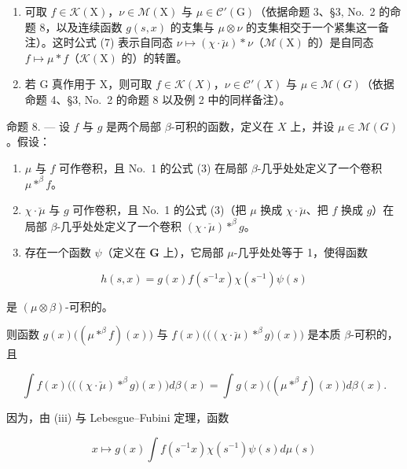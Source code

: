 \begin{enumerate}
\def\labelenumi{\arabic{enumi})}
\setcounter{enumi}{1}
\item
  可取 \(f \in \mathcal{K}(\mathrm{X})\)，\(\nu \in \mathcal{M}(\mathrm{X})\) 与 \(\mu \in \mathcal{C}'(\mathrm{G})\)（依据命题 3、§3, No.~2 的命题 8，以及连续函数 \(g(s,x)\) 的支集与 \(\mu \otimes \nu\) 的支集相交于一个紧集这一备注）。这时公式 (7) 表示自同态 \(\nu \mapsto (\chi \cdot \breve{\mu}) * \nu\)（\(\mathcal{M}(\mathrm{X})\) 的）是自同态 \(f \mapsto \mu * f\)（\(\mathcal{K}(\mathrm{X})\) 的）的转置。
\item
  若 G 真作用于 X，则可取 \(f \in \mathcal{K}(X)\)，\(\nu \in \mathcal{C}'(X)\) 与 \(\mu \in \mathcal{M}(G)\)（依据命题 4、§3, No.~2 的命题 8 以及例 2 中的同样备注）。
\end{enumerate}

命题 8. --- 设 \(f\) 与 \(g\) 是两个局部 \(\beta\)-可积的函数，定义在 \(X\) 上，并设 \(\mu \in \mathcal{M}(G)\)。假设：

\begin{enumerate}
\def\labelenumi{(\roman{enumi})}
\item
  \(\mu\) 与 \(f\) 可作卷积，且 No.~1 的公式 (3) 在局部 \(\beta\)-几乎处处定义了一个卷积 \(\mu *^{\beta} f\)。
\item
  \(\chi \cdot \breve{\mu}\) 与 \(g\) 可作卷积，且 No.~1 的公式 (3)（把 \(\mu\) 换成 \(\chi \cdot \breve{\mu}\)、把 \(f\) 换成 \(g\)）在局部 \(\beta\)-几乎处处定义了一个卷积 \((\chi \cdot \breve{\mu}) *^{\beta} g\)。
\item
  存在一个函数 \(\psi\)（定义在 \(\mathbf{G}\) 上），它局部 \(\mu\)-几乎处处等于 1，使得函数
\end{enumerate}

\[
h (s, x) = g (x) f \left(s ^ {- 1} x\right) \chi \left(s ^ {- 1}\right) \psi (s)
\]

是 \((\mu \otimes \beta)\)-可积的。

则函数 \(g(x)\big((\mu * ^ {\beta} f)(x)\big)\) 与 \(f(x)\big(\big((\chi \cdot \breve{\mu}) * ^ {\beta} g\big)(x)\big)\) 是本质 \(\beta\)-可积的，且

\[
\int f (x) \big (\big ((\chi \cdot \breve {\mu}) * ^ {\beta} g \big) (x) \big) d \beta (x) = \int g (x) \big ((\mu * ^ {\beta} f) (x) \big) d \beta (x).\tag{8}
\]

因为，由 (iii) 与 Lebesgue--Fubini 定理，函数

\[
x \mapsto g (x) \int f (s ^ {- 1} x) \chi (s ^ {- 1}) \psi (s) d \mu (s)
\]

